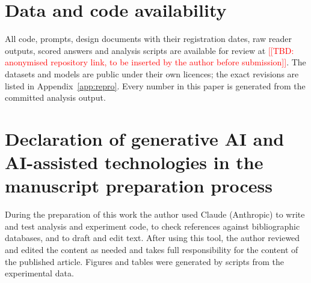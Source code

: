 \section*{Data and code availability}
All code, prompts, design documents with their registration dates, raw reader outputs, scored answers and analysis scripts are available for review at \textcolor{red}{[[TBD: anonymised repository link, to be inserted by the author before submission]]}. The datasets and models are public under their own licences; the exact revisions are listed in Appendix~\ref{app:repro}. Every number in this paper is generated from the committed analysis output.

\section*{Declaration of generative AI and AI-assisted technologies in the manuscript preparation process}
During the preparation of this work the author used Claude (Anthropic) to write and test analysis and experiment code, to check references against bibliographic databases, and to draft and edit text. After using this tool, the author reviewed and edited the content as needed and takes full responsibility for the content of the published article. Figures and tables were generated by scripts from the experimental data.
